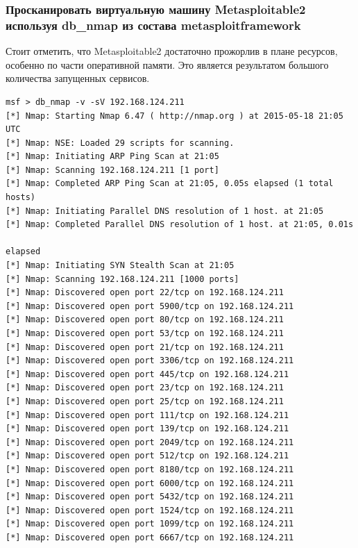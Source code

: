 \documentclass[a4paper, 12pt]{article}		%
\begin{document}
\newpage
\subsubsection{Просканировать виртуальную машину Metasploitable2 используя db\_nmap из состава metasploit\-framework}




Стоит отметить, что Metasploitable2 достаточно прожорлив в плане ресурсов, особенно по части оперативной памяти. Это является результатом большого количества запущенных сервисов.

\begin{Verbatim}[frame=single]
msf > db_nmap -v -sV 192.168.124.211
[*] Nmap: Starting Nmap 6.47 ( http://nmap.org ) at 2015-05-18 21:05 UTC
[*] Nmap: NSE: Loaded 29 scripts for scanning.
[*] Nmap: Initiating ARP Ping Scan at 21:05
[*] Nmap: Scanning 192.168.124.211 [1 port]
[*] Nmap: Completed ARP Ping Scan at 21:05, 0.05s elapsed (1 total hosts)
[*] Nmap: Initiating Parallel DNS resolution of 1 host. at 21:05
[*] Nmap: Completed Parallel DNS resolution of 1 host. at 21:05, 0.01s
                                                                      elapsed
[*] Nmap: Initiating SYN Stealth Scan at 21:05
[*] Nmap: Scanning 192.168.124.211 [1000 ports]
[*] Nmap: Discovered open port 22/tcp on 192.168.124.211
[*] Nmap: Discovered open port 5900/tcp on 192.168.124.211
[*] Nmap: Discovered open port 80/tcp on 192.168.124.211
[*] Nmap: Discovered open port 53/tcp on 192.168.124.211
[*] Nmap: Discovered open port 21/tcp on 192.168.124.211
[*] Nmap: Discovered open port 3306/tcp on 192.168.124.211
[*] Nmap: Discovered open port 445/tcp on 192.168.124.211
[*] Nmap: Discovered open port 23/tcp on 192.168.124.211
[*] Nmap: Discovered open port 25/tcp on 192.168.124.211
[*] Nmap: Discovered open port 111/tcp on 192.168.124.211
[*] Nmap: Discovered open port 139/tcp on 192.168.124.211
[*] Nmap: Discovered open port 2049/tcp on 192.168.124.211
[*] Nmap: Discovered open port 512/tcp on 192.168.124.211
[*] Nmap: Discovered open port 8180/tcp on 192.168.124.211
[*] Nmap: Discovered open port 6000/tcp on 192.168.124.211
[*] Nmap: Discovered open port 5432/tcp on 192.168.124.211
[*] Nmap: Discovered open port 1524/tcp on 192.168.124.211
[*] Nmap: Discovered open port 1099/tcp on 192.168.124.211
[*] Nmap: Discovered open port 6667/tcp on 192.168.124.211

\end{Verbatim}
\end{document}
